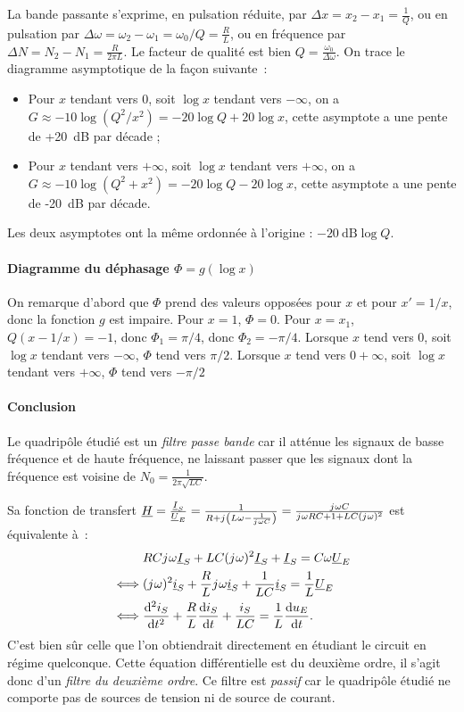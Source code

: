 La bande passante s'exprime, en pulsation réduite, par \(\Delta x = x_2 - x_1 = 
\frac{1}{Q}\), ou en pulsation par \(\Delta \omega = \omega_2 - \omega_1 = 
\omega_0/Q = \frac{R}{L}\), ou en fréquence par \(\Delta N = N_2- N_1 = 
\frac{R}{2\pi L}\). Le facteur de qualité est bien \(Q = \frac{\omega_0}{\Delta 
\omega}\). On trace le diagramme asymptotique de la façon suivante~:
\begin{itemize}%
	\item Pour \(x\) tendant vers \(0\), soit \(\log x\) tendant vers 
		\(-\infty\), on a \(G \approx -10\log(Q^2/x^2) = -20\log Q +20\log x\), 
		cette asymptote a une pente de +\SI{20}{\dB} par décade ;
	\item Pour \(x\) tendant vers \(+\infty\), soit \(\log x\) tendant vers 
		\(+\infty\), on a \(G \approx -10\log(Q^2+x^2) = -20\log Q -20\log x\), 
		cette asymptote a une pente de -\SI{20}{\dB} par décade.
\end{itemize}%
Les deux asymptotes ont la même ordonnée à l'origine : \(-\SI{20}{\dB}\log Q\).
\paragraph{Diagramme du déphasage \(\Phi = g(\log x)\)}%

On remarque d'abord que \(\Phi\) prend des valeurs opposées pour \(x\) et pour 
\(x'=1/x\), donc la fonction \(g\) est impaire. Pour \(x=1\), \(\Phi = 0\). 
Pour \(x=x_1\), \(Q(x-1/x)=-1\), donc \(\Phi_1=\pi/4\), donc \(\Phi_2=-\pi/4\). 
Lorsque \(x\) tend vers \(0\), soit \(\log x\) tendant vers \(-\infty\), 
\(\Phi\) tend vers \(\pi/2\). Lorsque \(x\) tend vers \(0+\infty\), soit \(\log 
x\) tendant vers \(+\infty\), \(\Phi\) tend vers \(-\pi/2\)
\paragraph{Conclusion}%

Le quadripôle étudié est un \emph{filtre passe bande} car il atténue les 
signaux de basse fréquence et de haute fréquence, ne laissant passer que les 
signaux dont la fréquence est voisine de \(N_0 = \frac{1}{2\pi\sqrt{LC}}\).

Sa fonction de transfert \(\underline{H} = \frac{\underline{I}_S}{\underline{U}_E} = \frac{1}{R+{j\mkern1mu}\left( 
L\omega -\frac{1}{{j\mkern1mu} \omega C} \right)} = \frac{{j\mkern1mu} \omega C}{{j\mkern1mu} \omega R C + 
1 +LC ({j\mkern1mu} \omega)^2}\) est équivalente à~:
\begin{align}%
	& RC \ju \omega \Ic_S + LC (\ju \omega)^2 \Ic_S + \Ic_S = C \omega \Uc_E \\
	\iff & (\ju \omega)^2 \ic_S + \frac{R}{L} \ju\omega \ic_S + \frac{1}{LC} 
	\ic_S = \frac{1}{L} \Uc_E \\
	\iff & \deriveds{i_S}{t} + \frac{R}{L} \derived{i_S}{t} + \frac{i_S}{LC} = 
	\frac{1}{L} \derived{u_E}{t}.
\end{align}%
C'est bien sûr celle que l'on obtiendrait directement en étudiant le circuit en 
régime quelconque. Cette équation différentielle est du deuxième ordre, il 
s'agit donc d'un \emph{filtre du deuxième ordre}. Ce filtre est \emph{passif} 
car le quadripôle étudié ne comporte pas de sources de tension ni de source de 
courant.


